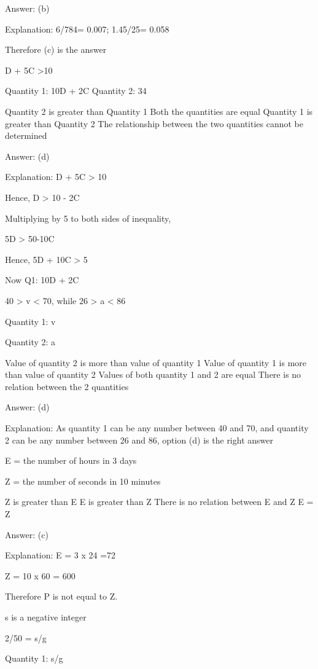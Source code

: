     Answer: (b)

    Explanation: 6/784= 0.007; 1.45/25= 0.058

    Therefore (c) is the answer 



    D + 5C >10

    Quantity 1: 10D + 2C Quantity 2: 34

        Quantity 2 is greater than Quantity 1
        Both the quantities are equal
        Quantity 1 is greater than Quantity 2
        The relationship between the two quantities cannot be determined

    Answer: (d)

    Explanation:  D + 5C > 10

    Hence, D > 10 - 2C

    Multiplying by 5 to both sides of inequality,

    5D > 50-10C

    Hence, 5D + 10C > 5

    Now Q1: 10D + 2C

    40 > v < 70, while 26 > a < 86

    Quantity 1: v

    Quantity 2: a

        Value of quantity 2 is more than value of quantity 1
        Value of quantity 1 is more than value of quantity 2
        Values of both quantity 1 and 2 are equal
        There is no relation between the 2 quantities

    Answer: (d)

    Explanation: As quantity 1 can be any number between 40 and 70, and quantity 2 can be any number between 26 and 86, option (d) is the right answer

    E = the number of hours in 3 days

    Z = the number of seconds in 10 minutes

        Z is greater than E
        E is greater than Z
        There is no relation between E and Z
        E = Z

    Answer: (c)

    Explanation: E = 3 x 24 =72

    Z = 10 x 60 = 600

    Therefore P is not equal to Z.

    s is a negative integer

    2/50 = s/g

    Quantity 1: s/g

